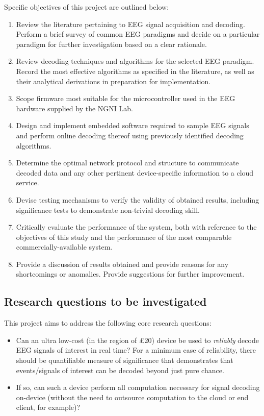 Specific objectives of this project are outlined below:
\begin{enumerate}
    \item Review the literature pertaining to EEG signal acquisition and decoding. Perform a brief survey of common EEG paradigms and decide on a particular paradigm for further investigation based on a clear rationale. 
    \item Review decoding techniques and algorithms for the selected EEG paradigm. Record the most effective algorithms as specified in the literature, as well as their analytical derivations in preparation for implementation. 
    \item Scope firmware most suitable for the microcontroller used in the EEG hardware supplied by the NGNI Lab.
    \item Design and implement embedded software required to sample EEG signals and perform online decoding thereof using previously identified decoding algorithms.
    \item Determine the optimal network protocol and structure to communicate decoded data and any other pertinent device-specific information to a cloud service.
    \item Devise testing mechanisms to verify the validity of obtained results, including significance tests to demonstrate non-trivial decoding skill.
    \item Critically evaluate the performance of the system, both with reference to the objectives of this study and the performance of the most comparable commercially-available system.
    \item Provide a discussion of results obtained and provide reasons for any shortcomings or anomalies. Provide suggestions for further improvement.
    
\end{enumerate}


\subsection{Research questions to be investigated}
This project aims to address the following core research questions: 
\begin{itemize}
    \item Can an ultra low-cost (in the region of £20) device be used to \textit{reliably} decode EEG signals of interest in real time? For a minimum case of reliability, there should be quantifiable measure of significance that demonstrates that events/signals of interest can be decoded beyond just pure chance. 
    \item If so, can such a device perform all computation necessary for signal decoding on-device (without the need to outsource computation to the cloud or end client, for example)? 
\end{itemize}
